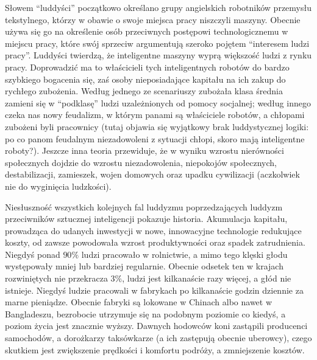 \documentclass[10pt,a4paper]{article}
\begin{document}
	\par Słowem ``luddyści'' początkowo określano grupy angielskich robotników przemysłu tekstylnego, którzy w obawie o swoje miejsca pracy niszczyli maszyny. Obecnie używa się go na określenie osób przeciwnych postępowi technologicznemu w miejscu pracy, które swój sprzeciw argumentują szeroko pojętem ``interesem ludzi pracy''. Luddyści twierdzą, że inteligentne maszyny wyprą większość ludzi z rynku pracy. Doprowadzić ma to właścicieli tych inteligentnych robotów do bardzo szybkiego bogacenia się, zaś osoby nieposiadające kapitału na ich zakup do rychłego zubożenia. Według jednego ze scenariuszy zubożała klasa średnia zamieni się w ``podklasę'' ludzi uzależnionych od pomocy socjalnej; według innego czeka nas nowy feudalizm, w którym panami są właściciele robotów, a chłopami zubożeni byli pracownicy (tutaj objawia się wyjątkowy brak luddystycznej logiki: po co panom feudalnym niezadowoleni z sytuacji chłopi, skoro mają inteligentne roboty?). Jeszcze inna teoria przewiduje, że w wyniku wzrostu nierówności społecznych dojdzie do wzrostu niezadowolenia, niepokojów społecznych, destabilizacji, zamieszek, wojen domowych oraz upadku cywilizacji (aczkolwiek nie do wyginięcia ludzkości).
	\par Niesłuszność wszystkich kolejnych fal luddyzmu poprzedzających luddyzm przeciwników sztucznej inteligencji pokazuje historia. Akumulacja kapitału, prowadząca do udanych inwestycji w nowe, innowacyjne technologie redukujące koszty, od zawsze powodowała wzrost produktywności oraz spadek zatrudnienia. Niegdyś ponad $90\%$ ludzi pracowało w rolnictwie, a mimo tego klęski głodu występowały mniej lub bardziej regularnie. Obecnie odsetek ten w krajach rozwiniętych nie przekracza $3\%$, ludzi jest kilkanaście razy więcej, a głód nie istnieje. Niegdyś ludzie pracowali w fabrykach po kilkanaście godzin dziennie za marne pieniądze. Obecnie fabryki są lokowane w Chinach albo nawet w Bangladeszu, bezrobocie utrzymuje się na podobnym poziomie co kiedyś, a poziom życia jest znacznie wyższy. Dawnych hodowców koni zastąpili producenci samochodów, a dorożkarzy taksówkarze (a ich zastępują obecnie uberowcy), czego skutkiem jest zwiększenie prędkości i komfortu podróży, a zmniejszenie kosztów.
\end{document}
